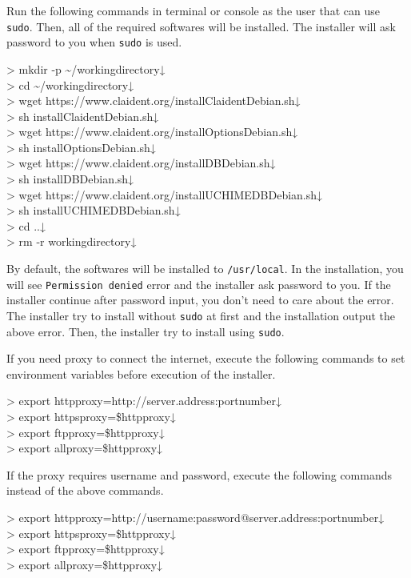 \documentclass[titlepage,10pt,a4paper,english]{jsbook}
\newenvironment{cmd}{\begin{oframed}\raggedright\ttfamily\footnotesize\setlength{\baselineskip}{1.4em}}{\end{oframed}\vspace{-1em}}
\begin{document}
Run the following commands in terminal or console as the user that can use \texttt{sudo}. Then, all of the required softwares will be installed. The installer will ask password to you when \texttt{sudo} is used.
\begin{cmd}
{\textgreater} mkdir -p {\textasciitilde}/workingdirectory↓\\
{\textgreater} cd {\textasciitilde}/workingdirectory↓\\
{\textgreater} wget https://www.claident.org/installClaident{\textunderscore}Debian.sh↓\\
{\textgreater} sh installClaident{\textunderscore}Debian.sh↓\\
{\textgreater} wget https://www.claident.org/installOptions{\textunderscore}Debian.sh↓\\
{\textgreater} sh installOptions{\textunderscore}Debian.sh↓\\
{\textgreater} wget https://www.claident.org/installDB{\textunderscore}Debian.sh↓\\
{\textgreater} sh installDB{\textunderscore}Debian.sh↓\\
{\textgreater} wget https://www.claident.org/installUCHIMEDB{\textunderscore}Debian.sh↓\\
{\textgreater} sh installUCHIMEDB{\textunderscore}Debian.sh↓\\
{\textgreater} cd ..↓\\
{\textgreater} rm -r workingdirectory↓
\end{cmd}
By default, the softwares will be installed to \texttt{/usr/local}. In the installation, you will see \texttt{Permission denied} error and the installer ask password to you. If the installer continue after password input, you don't need to care about the error. The installer try to install without \texttt{sudo} at first and the installation output the above error. Then, the installer try to install using \texttt{sudo}.

If you need proxy to connect the internet, execute the following commands to set environment variables before execution of the installer.
\begin{cmd}
{\textgreater} export http{\textunderscore}proxy=http://server.address:portnumber↓\\
{\textgreater} export https{\textunderscore}proxy=\$http{\textunderscore}proxy↓\\
{\textgreater} export ftp{\textunderscore}proxy=\$http{\textunderscore}proxy↓\\
{\textgreater} export all{\textunderscore}proxy=\$http{\textunderscore}proxy↓
\end{cmd}
If the proxy requires username and password, execute the following commands instead of the above commands.
\begin{cmd}
{\textgreater} export http{\textunderscore}proxy=http://username:password@server.address:portnumber↓\\
{\textgreater} export https{\textunderscore}proxy=\$http{\textunderscore}proxy↓\\
{\textgreater} export ftp{\textunderscore}proxy=\$http{\textunderscore}proxy↓\\
{\textgreater} export all{\textunderscore}proxy=\$http{\textunderscore}proxy↓
\end{cmd}
\end{document}
